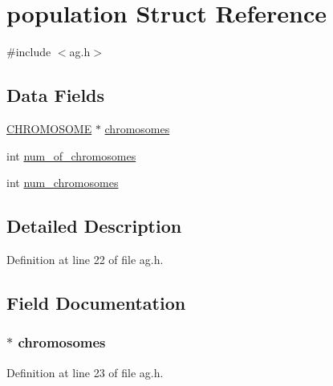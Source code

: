 \hypertarget{structpopulation}{}\section{population Struct Reference}
\label{structpopulation}


{\ttfamily \#include $<$ag.\+h$>$}

\subsection*{Data Fields}
\begin{DoxyCompactItemize}
\item 
\hyperlink{ag_8h_aa412b0901c525d0ec02d820314c89bca}{C\+H\+R\+O\+M\+O\+S\+O\+M\+E} $\ast$ \hyperlink{structpopulation_af7678e97ae4d0c70698aef564c70dd73}{chromosomes}
\item 
int \hyperlink{structpopulation_a42616d859cb4473989f2a7189e7197e8}{num\+\_\+of\+\_\+chromosomes}
\item 
int \hyperlink{structpopulation_a087834ee296c3dace15dcff45794ac5e}{num\+\_\+chromosomes}
\end{DoxyCompactItemize}


\subsection{Detailed Description}


Definition at line 22 of file ag.\+h.



\subsection{Field Documentation}
\hypertarget{structpopulation_af7678e97ae4d0c70698aef564c70dd73}{}
\subsubsection[{chromosomes}]{ $\ast$ {\bf chromosomes}}\label{structpopulation_af7678e97ae4d0c70698aef564c70dd73}


Definition at line 23 of file ag.\+h.

\hypertarget{structpopulation_a087834ee296c3dace15dcff45794ac5e}{}
